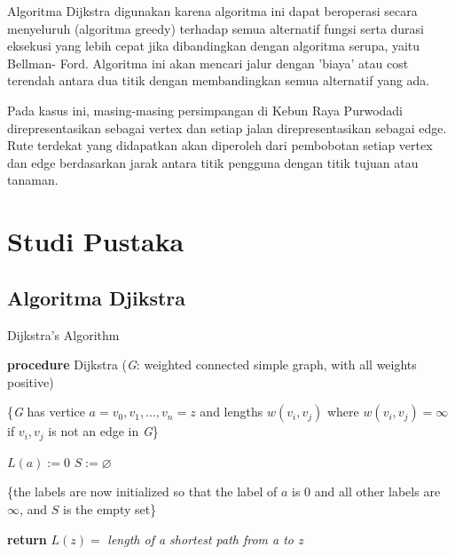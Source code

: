 \documentclass[conference]{IEEEtran}
\begin{document}
Algoritma Dijkstra digunakan karena algoritma ini dapat
beroperasi secara menyeluruh (algoritma greedy) terhadap
semua alternatif fungsi serta durasi eksekusi yang lebih cepat
jika dibandingkan dengan algoritma serupa, yaitu Bellman-
Ford. Algoritma ini akan mencari jalur dengan ’biaya’ atau
cost terendah antara dua titik dengan membandingkan semua
alternatif yang ada.

Pada kasus ini, masing-masing persimpangan di Kebun
Raya Purwodadi direpresentasikan sebagai vertex dan setiap
jalan direpresentasikan sebagai edge. Rute terdekat yang didapatkan
akan diperoleh dari pembobotan setiap vertex dan edge
berdasarkan jarak antara titik pengguna dengan titik tujuan
atau tanaman.

\section{Studi Pustaka}

\subsection{Algoritma Djikstra}

\begin{algorithm}
    \caption{Dijkstra's Algorithm}
    \SetAlgoLined
    \DontPrintSemicolon
   
    \textbf{procedure} Dijkstra (\textit{G}: weighted connected simple graph, with all weights positive)
    
    \{\textit{G} has vertice $a = v_0, v_1, ..., v_n = z$ and lengths $w(v_i, v_j)$ where $w(v_i, v_j) = \infty$ if $v_i, v_j$ is not an edge in \textit{G}\}
    
    $L(a) := 0$\;
    $S := \varnothing$

    \{the labels are now initialized so that the label of $a$ is 0 and all other labels are $\infty$, and $S$ is the empty set\}

    \textbf{return} $L(z)=$ \textit{length of a shortest path from a to z}
\end{algorithm}
\end{document}
